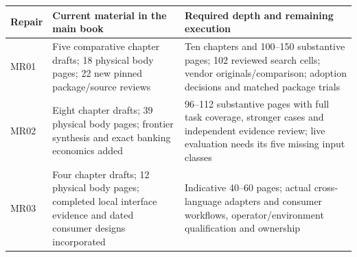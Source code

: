 \documentclass[
  11pt,
  a4paper,
]{article}
\begin{document}
\begin{longtable}[]{@{}lll@{}}
\toprule
\begin{minipage}[b]{0.30\columnwidth}\raggedright
Repair\strut
\end{minipage} & \begin{minipage}[b]{0.30\columnwidth}\raggedright
Current material in the main book\strut
\end{minipage} & \begin{minipage}[b]{0.30\columnwidth}\raggedright
Required depth and remaining execution\strut
\end{minipage}\tabularnewline
\midrule
\endhead
\begin{minipage}[t]{0.30\columnwidth}\raggedright
MR01\strut
\end{minipage} & \begin{minipage}[t]{0.30\columnwidth}\raggedright
Five comparative chapter drafts; 18 physical body pages; 22 new pinned
package/source reviews\strut
\end{minipage} & \begin{minipage}[t]{0.30\columnwidth}\raggedright
Ten chapters and 100--150 substantive pages; 102 reviewed search cells;
vendor originals/comparison; adoption decisions and matched package
trials\strut
\end{minipage}\tabularnewline
\begin{minipage}[t]{0.30\columnwidth}\raggedright
MR02\strut
\end{minipage} & \begin{minipage}[t]{0.30\columnwidth}\raggedright
Eight chapter drafts; 39 physical body pages; frontier synthesis and
exact banking economics added\strut
\end{minipage} & \begin{minipage}[t]{0.30\columnwidth}\raggedright
96--112 substantive pages with full task coverage, stronger cases and
independent evidence review; live evaluation needs its five missing
input classes\strut
\end{minipage}\tabularnewline
\begin{minipage}[t]{0.30\columnwidth}\raggedright
MR03\strut
\end{minipage} & \begin{minipage}[t]{0.30\columnwidth}\raggedright
Four chapter drafts; 12 physical body pages; completed local interface
evidence and dated consumer designs incorporated\strut
\end{minipage} & \begin{minipage}[t]{0.30\columnwidth}\raggedright
Indicative 40--60 pages; actual cross-language adapters and consumer
workflows, operator/environment qualification and ownership\strut
\end{minipage}\tabularnewline
\bottomrule
\end{longtable}
\end{document}
